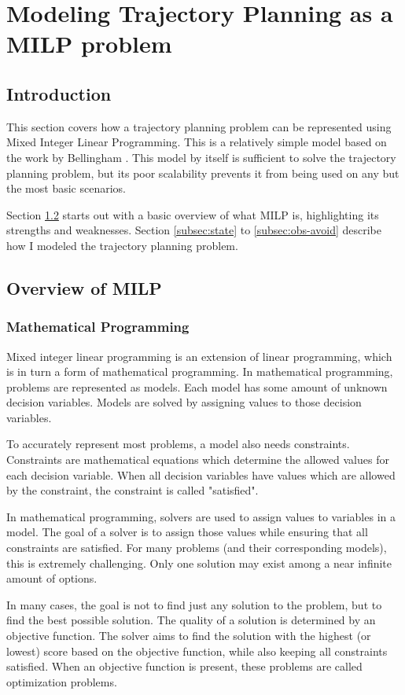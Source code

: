 \chapter{Modeling Trajectory Planning as a MILP problem}
\label{section:modelingbasic}
\section{Introduction}
This section covers how a trajectory planning problem can be represented using Mixed Integer Linear Programming. This is a relatively simple model based on the work by Bellingham \cite{Bellingham2002}. This model by itself is sufficient to solve the trajectory planning problem, but its poor scalability prevents it from being used on any but the most basic scenarios.
\par
Section \ref{subsec:milp-overview} starts out with a basic overview of what MILP is, highlighting its strengths and weaknesses. Section \ref{subsec:state} to \ref{subsec:obs-avoid} describe how I modeled the trajectory planning problem. 


\section{Overview of MILP}
\label{subsec:milp-overview}
\subsection{Mathematical Programming}
Mixed integer linear programming is an extension of linear programming, which is in turn a form of mathematical programming. In mathematical programming, problems are represented as models. Each model has some amount of unknown decision variables. Models are solved by assigning values to those decision variables.
\par
To accurately represent most problems, a model also needs constraints. Constraints are mathematical equations which determine the allowed values for each decision variable. When all decision variables have values which are allowed by the constraint, the constraint is called "satisfied".
\par
In mathematical programming, solvers are used to assign values to variables in a model. The goal of a solver is to assign those values while ensuring that all constraints are satisfied. For many problems (and their corresponding models), this is extremely challenging. Only one solution may exist among a near infinite amount of options.
\par
In many cases, the goal is not to find just any solution to the problem, but to find the best possible solution. The quality of a solution is determined by an objective function. The solver aims to find the solution with the highest (or lowest) score based on the objective function, while also keeping all constraints satisfied. When an objective function is present, these problems are called optimization problems.
\par
